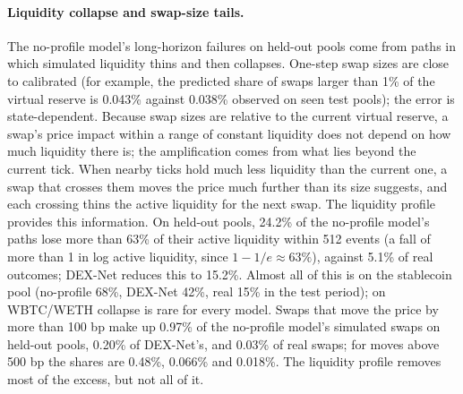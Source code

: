 \documentclass[11pt]{article}
\begin{document}
\paragraph{Liquidity collapse and swap-size tails.} The no-profile model's long-horizon failures on held-out pools come from paths in which simulated liquidity thins and then collapses. One-step swap sizes are close to calibrated (for example, the predicted share of swaps larger than 1\% of the virtual reserve is 0.043\% against 0.038\% observed on seen test pools); the error is state-dependent. Because swap sizes are relative to the current virtual reserve, a swap's price impact within a range of constant liquidity does not depend on how much liquidity there is; the amplification comes from what lies beyond the current tick. When nearby ticks hold much less liquidity than the current one, a swap that crosses them moves the price much further than its size suggests, and each crossing thins the active liquidity for the next swap. The liquidity profile provides this information. On held-out pools, 24.2\% of the no-profile model's paths lose more than 63\% of their active liquidity within 512 events (a fall of more than 1 in log active liquidity, since $1 - 1/e \approx 63\%$), against 5.1\% of real outcomes; DEX-Net reduces this to 15.2\%. Almost all of this is on the stablecoin pool (no-profile 68\%, DEX-Net 42\%, real 15\% in the test period); on WBTC/WETH collapse is rare for every model. Swaps that move the price by more than 100 bp make up 0.97\% of the no-profile model's simulated swaps on held-out pools, 0.20\% of DEX-Net's, and 0.03\% of real swaps; for moves above 500 bp the shares are 0.48\%, 0.066\% and 0.018\%. The liquidity profile removes most of the excess, but not all of it.
\end{document}
